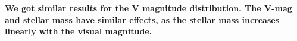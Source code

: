 \documentclass[structabstract]{aa}
\begin{document}
%
%
%
%
 

\textbf{We got similar results for the V magnitude distribution. The V-mag and stellar mass have similar effects, as the stellar mass increases linearly with the visual magnitude.}
\end{document}
